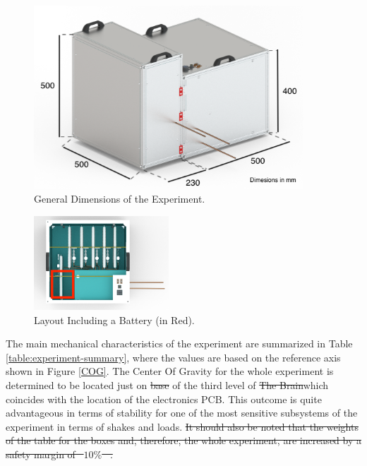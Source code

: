 \documentclass[a4paper,12pt,oneside]{article} %
\providecommand{\DIFaddtex}[1]{{\protect\color{blue}\uwave{#1}}} %
\providecommand{\DIFdeltex}[1]{{\protect\color{red}\sout{#1}}}                      %
\providecommand{\DIFaddbegin}{} %
\providecommand{\DIFaddend}{} %
\providecommand{\DIFdelbegin}{} %
\providecommand{\DIFdelend}{} %
\providecommand{\DIFaddbeginFL}{} %
\providecommand{\DIFaddendFL}{} %
\providecommand{\DIFdelbeginFL}{} %
\providecommand{\DIFdelendFL}{} %
\providecommand{\DIFadd}[1]{\texorpdfstring{\DIFaddtex{#1}}{#1}} %
\providecommand{\DIFdel}[1]{\texorpdfstring{\DIFdeltex{#1}}{}} %
\newcommand{\DIFscaledelfig}{0.5}
\newlength{\DIFdelgraphicswidth} %
\newlength{\DIFdelgraphicsheight} %
\newcommand{\DIFaddincludegraphics}[2][]{{\color{blue}\fbox{\DIFOincludegraphics[#1]{#2}}}} %
\newcommand{\DIFdelincludegraphics}[2][]{%
\sbox{\DIFdelgraphicsbox}{\DIFOincludegraphics[#1]{#2}}%
\settoboxwidth{\DIFdelgraphicswidth}{\DIFdelgraphicsbox} %
\settoboxtotalheight{\DIFdelgraphicsheight}{\DIFdelgraphicsbox} %
\scalebox{\DIFscaledelfig}{%
\parbox[b]{\DIFdelgraphicswidth}{\usebox{\DIFdelgraphicsbox}\\[-\baselineskip] \rule{\DIFdelgraphicswidth}{0em}}\llap{\resizebox{\DIFdelgraphicswidth}{\DIFdelgraphicsheight}{%
\setlength{\unitlength}{\DIFdelgraphicswidth}%
\begin{picture}(1,1)%
\thicklines\linethickness{2pt} %
{\color[rgb]{1,0,0}\put(0,0){\framebox(1,1){}}}%
{\color[rgb]{1,0,0}\put(0,0){\line( 1,1){1}}}%
{\color[rgb]{1,0,0}\put(0,1){\line(1,-1){1}}}%
\end{picture}%
}\hspace*{3pt}}} %
} %
\DeclareRobustCommand{\DIFaddbegin}{\DIFOaddbegin \let\includegraphics\DIFaddincludegraphics} %
\DeclareRobustCommand{\DIFaddend}{\DIFOaddend \let\includegraphics\DIFOincludegraphics} %
\DeclareRobustCommand{\DIFdelbegin}{\DIFOdelbegin \let\includegraphics\DIFdelincludegraphics} %
\DeclareRobustCommand{\DIFdelend}{\DIFOaddend \let\includegraphics\DIFOincludegraphics} %
\DeclareRobustCommand{\DIFaddbeginFL}{\DIFOaddbeginFL \let\includegraphics\DIFaddincludegraphics} %
\DeclareRobustCommand{\DIFaddendFL}{\DIFOaddendFL \let\includegraphics\DIFOincludegraphics} %
\DeclareRobustCommand{\DIFdelbeginFL}{\DIFOdelbeginFL \let\includegraphics\DIFdelincludegraphics} %
\DeclareRobustCommand{\DIFdelendFL}{\DIFOaddendFL \let\includegraphics\DIFOincludegraphics} %
\begin{document}
 \begin{figure}[H]
     \centering
     \DIFdelbeginFL %
\DIFdelendFL \DIFaddbeginFL \includegraphics[width=0.9\textwidth]{4-experiment-design/img/Mechanical/Figure_14.png}
     \DIFaddendFL \caption{General Dimensions of the Experiment.}
     \label{dimensions}
\end{figure}

\begin{figure}[H]
    \centering
    \DIFdelbeginFL %
\DIFdelendFL \DIFaddbeginFL \includegraphics[width=0.45\textwidth]{4-experiment-design/img/Mechanical/Figure_15.png}
    \DIFaddendFL \caption{Layout Including a Battery (in Red).}
    \label{battery_distribution}
\end{figure}

The main mechanical characteristics of the experiment are summarized in Table \ref{table:experiment-summary}, where the values are based on the reference axis shown in Figure \ref{COG}. The Center Of Gravity for the whole experiment is determined to be located just on \DIFdelbegin \DIFdel{base }\DIFdelend \DIFaddbegin \DIFadd{the plate }\DIFaddend of the third level of \DIFdelbegin \DIFdel{The Brain}\DIFdelend \DIFaddbegin \DIFadd{the Brain, }\DIFaddend which coincides with the location of the electronics PCB. This outcome is quite advantageous in terms of stability for one of the most sensitive subsystems of the experiment in terms of shakes and loads. \DIFdelbegin \DIFdel{It should also be noted that the weights of the table for the boxes and, therefore, the whole experiment, are increased by a safety margin of \mbox{%
$10\%$
}%
.
}\DIFdelend %
\end{document}
